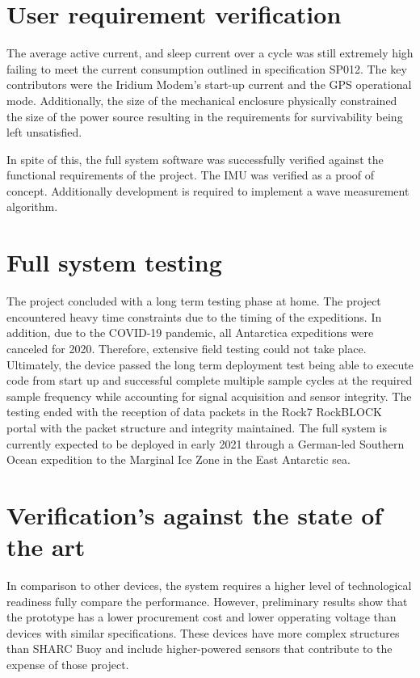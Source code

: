 \section{User requirement verification}
The average active current, and sleep current over a cycle was still extremely high failing to meet the current consumption outlined in specification SP012. The key contributors were the Iridium Modem's start-up current and the GPS operational mode. Additionally, the size of the mechanical enclosure physically constrained the size of the power source resulting in the requirements for survivability being left unsatisfied.\par 

In spite of this, the full system software was successfully verified against the functional requirements of the project. The IMU was verified as a proof of concept. Additionally development is required to implement  a wave measurement algorithm.

\section{Full system testing}

The project concluded with a long term testing phase at home. The project encountered heavy time constraints due to the timing of the expeditions. In addition, due to the COVID-19 pandemic, all Antarctica expeditions were canceled for 2020. Therefore, extensive field testing could not take place. Ultimately, the device passed the long term deployment test being able to execute code from start up and successful complete multiple sample cycles at the required sample frequency while accounting for signal acquisition and sensor integrity. The testing ended with the reception of data packets in the Rock7 RockBLOCK portal with the packet structure and integrity maintained. The full system is currently expected to be deployed in early 2021 through a German-led Southern Ocean expedition to the Marginal Ice Zone in the East Antarctic sea.

\section{Verification's against the state of the art}

In comparison to other devices, the system requires a higher level of technological readiness fully compare the performance. However, preliminary results show that the prototype has a lower procurement cost and lower opperating voltage than devices with similar specifications. These devices have more complex structures than SHARC Buoy and include higher-powered sensors that contribute to the expense of those project.


